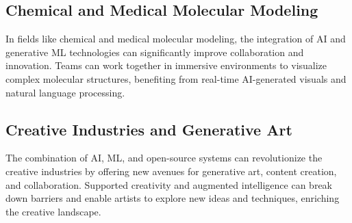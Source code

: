 \subsection{Chemical and Medical Molecular Modeling}
In fields like chemical and medical molecular modeling, the integration of AI and generative ML technologies can significantly improve collaboration and innovation. Teams can work together in immersive environments to visualize complex molecular structures, benefiting from real-time AI-generated visuals and natural language processing.

\subsection{Creative Industries and Generative Art}
The combination of AI, ML, and open-source systems can revolutionize the creative industries by offering new avenues for generative art, content creation, and collaboration. Supported creativity and augmented intelligence can break down barriers and enable artists to explore new ideas and techniques, enriching the creative landscape.
